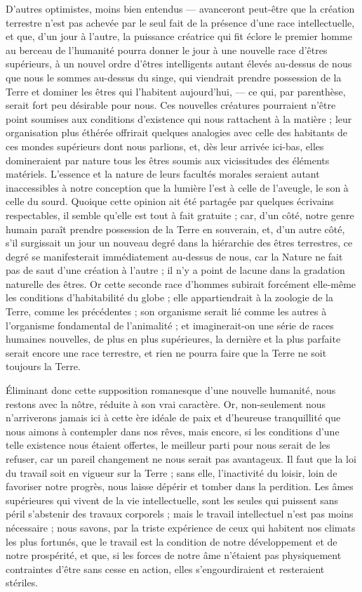 \documentclass[a4paper, 11pt, oneside, landscape]{article}
\begin{document}
D'autres optimistes, moins bien entendus --- avanceront peut-être que la création terrestre n'est pas achevée par le seul fait de la présence d'une race intellectuelle, et que, d'un jour à l'autre, la puissance créatrice qui fit éclore le premier homme au berceau de l'humanité pourra donner le jour à une nouvelle race d'êtres supérieurs, à un nouvel ordre d'êtres intelligents autant élevés au-dessus de nous que nous le sommes au-dessus du singe, qui viendrait prendre possession de la Terre et dominer les êtres qui l'habitent aujourd'hui, --- ce qui, par parenthèse, serait fort peu désirable pour nous. Ces nouvelles créatures pourraient n'être point soumises aux conditions d'existence qui nous rattachent à la matière ; leur organisation plus éthérée offrirait quelques analogies avec celle des habitants de ces mondes supérieurs dont nous parlions, et, dès leur arrivée ici-bas, elles domineraient par nature tous les êtres soumis aux vicissitudes des éléments matériels. L'essence et la nature de leurs facultés morales seraient autant inaccessibles à notre conception que la lumière l'est à celle de l'aveugle, le son à celle du sourd. Quoique cette opinion ait été partagée par quelques écrivains respectables, il semble qu'elle est tout à fait gratuite ; car, d'un côté, notre genre humain paraît prendre possession de la Terre en souverain, et, d'un autre côté, s'il surgissait un jour un nouveau degré dans la hiérarchie des êtres terrestres, ce degré se manifesterait immédiatement au-dessus de nous, car la Nature ne fait pas de saut d'une création à l'autre ; il n'y a point de lacune dans la gradation naturelle des êtres. Or cette seconde race d'hommes subirait forcément elle-même les conditions d'habitabilité du globe ; elle appartiendrait à la zoologie de la Terre, comme les précédentes ; son organisme serait lié comme les autres à l'organisme fondamental de l'animalité ; et imaginerait-on une série de races humaines nouvelles, de plus en plus supérieures, la dernière et la plus parfaite serait encore une race terrestre, et rien ne pourra faire que la Terre ne soit toujours la Terre.

Éliminant donc cette supposition romanesque d'une nouvelle humanité, nous restons avec la nôtre, réduite à son vrai caractère. Or, non-seulement nous n'arriverons jamais ici à cette ère idéale de paix et d'heureuse tranquillité que nous aimons à contempler dans nos rêves, mais encore, si les conditions d'une telle existence nous étaient offertes, le meilleur parti pour nous serait de les refuser, car un pareil changement ne nous serait pas avantageux. Il faut que la loi du travail soit en vigueur sur la Terre ; sans elle, l'inactivité du loisir, loin de favoriser notre progrès, nous laisse dépérir et tomber dans la perdition. Les âmes supérieures qui vivent de la vie intellectuelle, sont les seules qui puissent sans péril s'abstenir des travaux corporels ; mais le travail intellectuel n'est pas moins nécessaire ; nous savons, par la triste expérience de ceux qui habitent nos climats les plus fortunés, que le travail est la condition de notre développement et de notre prospérité, et que, si les forces de notre âme n'étaient pas physiquement contraintes d'être sans cesse en action, elles s'engourdiraient et resteraient stériles.
\end{document}
